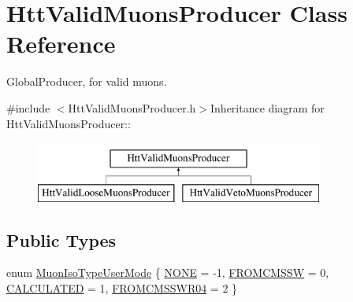 \hypertarget{classHttValidMuonsProducer}{
\section{HttValidMuonsProducer Class Reference}
\label{classHttValidMuonsProducer}
}


GlobalProducer, for valid muons.  


{\ttfamily \#include $<$HttValidMuonsProducer.h$>$}Inheritance diagram for HttValidMuonsProducer::\begin{figure}[H]
\begin{center}
\leavevmode
\includegraphics[height=2cm]{classHttValidMuonsProducer}
\end{center}
\end{figure}
\subsection*{Public Types}
\begin{DoxyCompactItemize}
\item 
enum \hyperlink{classHttValidMuonsProducer_aad2635063bc018555daf5c7e0eeeef9d}{MuonIsoTypeUserMode} \{ \hyperlink{classHttValidMuonsProducer_aad2635063bc018555daf5c7e0eeeef9da637dfe0effc2de8d0dedaee121915add}{NONE} =  -\/1, 
\hyperlink{classHttValidMuonsProducer_aad2635063bc018555daf5c7e0eeeef9da06729d6468ab1c8b660eec995f069135}{FROMCMSSW} =  0, 
\hyperlink{classHttValidMuonsProducer_aad2635063bc018555daf5c7e0eeeef9da7b599b6c372776d15d6511e71a5f660a}{CALCULATED} =  1, 
\hyperlink{classHttValidMuonsProducer_aad2635063bc018555daf5c7e0eeeef9da86e7cabd6af134034209db47738fd276}{FROMCMSSWR04} =  2
 \}
\end{DoxyCompactItemize}
